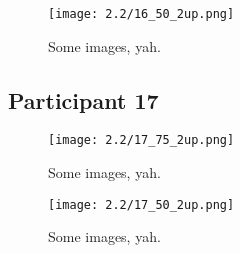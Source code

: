 \clearpage

\begin{figure}[h]
	\begin{center}
	\texttt{[image: 2.2/16\_50\_2up.png]}
	\caption{Some images, yah.}
	\end{center}
\end{figure}


\clearpage

\subsection{Participant 17}

\begin{figure}[h]
	\begin{center}
	\texttt{[image: 2.2/17\_75\_2up.png]}
	\caption{Some images, yah.}
	\end{center}
\end{figure}

\clearpage

\begin{figure}[h]
	\begin{center}
	\texttt{[image: 2.2/17\_50\_2up.png]}
	\caption{Some images, yah.}
	\end{center}
\end{figure}

